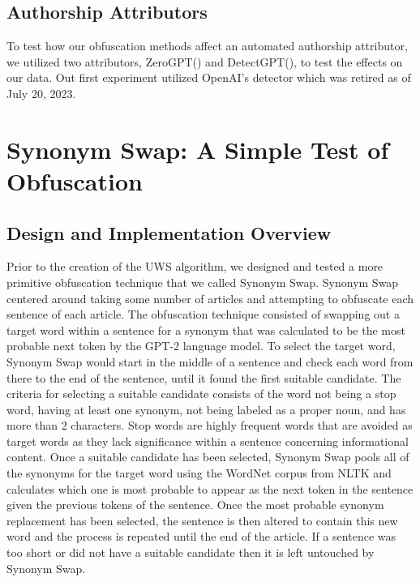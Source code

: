 \documentclass{article}
\begin{document}
\subsection{Authorship Attributors}
To test how our obfuscation methods affect an automated authorship attributor, we utilized two attributors, ZeroGPT(\cite{AITextDetector}) and DetectGPT(\cite{mitchell2023detectgpt}), to test the effects on our data. Out first experiment utilized OpenAI's detector which was retired as of July 20, 2023.

\section{Synonym Swap: A Simple Test of Obfuscation}
\subsection{Design and Implementation Overview}
Prior to the creation of the UWS algorithm, we designed and tested a more primitive obfuscation technique that we called Synonym Swap. Synonym Swap centered around taking some number of articles and attempting to obfuscate each sentence of each article. The obfuscation technique consisted of swapping out a target word within a sentence for a synonym that was calculated to be the most probable next token by the GPT-2 language model. To select the target word, Synonym Swap would start in the middle of a sentence and check each word from there to the end of the sentence, until it found the first suitable candidate. The criteria for selecting a suitable candidate consists of the word not being a stop word, having at least one synonym, not being labeled as a proper noun, and has more than 2 characters. Stop words are highly frequent words that are avoided as target words as they lack significance within a sentence concerning informational content. Once a suitable candidate has been selected, Synonym Swap pools all of the synonyms for the target word using the WordNet corpus from NLTK and calculates which one is most probable to appear as the next token in the sentence given the previous tokens of the sentence. Once the most probable synonym replacement has been selected, the sentence is then altered to contain this new word and the process is repeated until the end of the article. If a sentence was too short or did not have a suitable candidate then it is left untouched by Synonym Swap.
\end{document}
